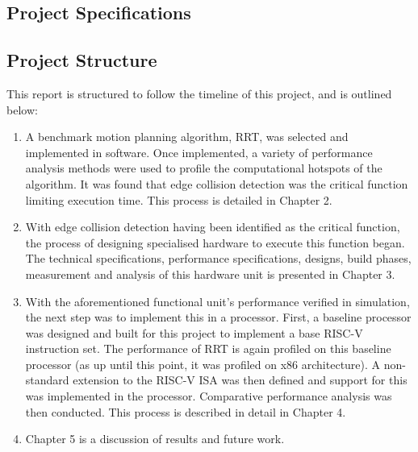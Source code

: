 
\subsection{Project Specifications}


\subsection{Project Structure}
\label{subsection:project_structure}
    This report is structured to follow the timeline of this project, and is outlined below:
    \begin{enumerate}
        \item A benchmark motion planning algorithm, \gls{RRT}, was selected and implemented in software. Once implemented, a variety of performance analysis methods were used to profile the computational hotspots of the algorithm. It was found that edge collision detection was the critical function limiting execution time. This process is detailed in Chapter 2.
        \item With edge collision detection having been identified as the critical function, the process of designing specialised hardware to execute this function began. The technical specifications, performance specifications, designs, build phases, measurement and analysis of this hardware unit is presented in Chapter 3.
        \item With the aforementioned functional unit's performance verified in simulation, the next step was to implement this in a processor. First, a baseline processor was designed and built for this project to implement a base RISC-V instruction set. The performance of \gls{RRT} is again profiled on this baseline processor (as up until this point, it was profiled on x86 architecture). A non-standard extension to the RISC-V \gls{ISA} was then defined and support for this was implemented in the processor. Comparative performance analysis was then conducted. This process is described in detail in Chapter 4.
        \item Chapter 5 is a discussion of results and future work.
    \end{enumerate}

